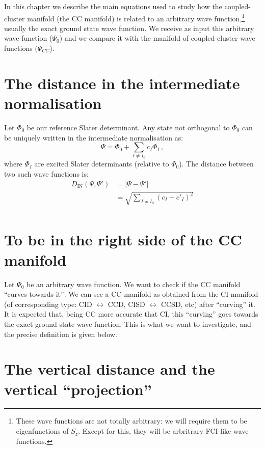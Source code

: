 In this chapter we describe the main equations used to study how the coupled-cluster manifold
(the CC manifold)
is related to an arbitrary wave function,\footnote{
  These wave functions are not totally arbitrary:
  we will require them to be eigenfunctions of $S_z$.
  Except for this, they will be arbritrary FCI-like wave functions.
  }
usually the exact ground state wave function.
We receive as input this arbitrary wave function ($\Psi_0$) and we compare it with the manifold
of coupled-cluster wave functions ($\Psi_{CC}$).

\section{The distance in the intermediate normalisation}
\hypertarget{sec:dist_interm_norm}{}
\label{sec:dist_interm_norm}

Let $\Phi_0$ be our reference Slater determinant.
Any state not orthogonal to $\Phi_0$ can be uniquely written in the intermediate normalisation as:
\begin{equation}
  \Psi = \Phi_0 + \sum_{I \ne I_0} c_I \Phi_I\,,
\end{equation}
where $\Phi_I$ are excited Slater determinants (relative to $\Phi_0$).
The distance between two such wave functions is:
\begin{equation}\label{eq:dist_intem_norm}
  \begin{split}
    D_\text{IN}(\Psi,\Psi') &= |\Psi - \Psi'|\\
    &=\sqrt{\sum_{I \ne I_0} (c_I - c'_I)^2 }\\
  \end{split}
\end{equation}

\section{To be in the right side of the CC manifold}

Let $\Psi_0$ be an arbitrary wave function.
We want to check if the CC manifold ``curves towards it'':
We can see a CC  manifold as obtained from the CI manifold (of corresponding type:
CID $\leftrightarrow$ CCD, CISD $\leftrightarrow$ CCSD, etc)
after ``curving'' it.
It is expected that, being CC more accurate that CI, this ``curving'' goes towards the exact
ground state wave function.
This is what we want to investigate, and the precise definition is given below.

\section{The vertical distance and the vertical ``projection''}

